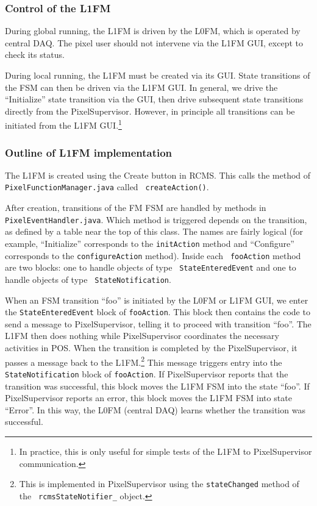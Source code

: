 \subsubsection{Control of the L1FM}

During global running, the L1FM is driven by the L0FM, which is
operated by central DAQ. The pixel user should not intervene via the
L1FM GUI, except to check its status.

During local running, the L1FM must be created via its GUI. State
transitions of the FSM can then be driven via the L1FM GUI. In
general, we drive the ``Initialize'' state transition via the GUI,
then drive subsequent state transitions directly from the
PixelSupervisor. However, in principle all transitions can be
initiated from the L1FM GUI.\footnote{In practice, this is only useful for simple tests of the L1FM to PixelSupervisor communication.}

\subsubsection{Outline of L1FM implementation}

The L1FM is created using the Create button in RCMS. This calls the
method of {\tt PixelFunctionManager.java} called {\tt
createAction()}.

After creation, transitions of the FM FSM are handled
by methods in {\tt PixelEventHandler.java}. Which method is triggered
depends on the transition, as defined by a table near the top of this
class. The names are fairly logical (for example, ``Initialize''
corresponds to the {\tt initAction} method and ``Configure''
corresponds to the {\tt configureAction} method). Inside each {\tt
fooAction} method are two blocks: one to handle objects of type {\tt
StateEnteredEvent} and one to handle objects of type {\tt
StateNotification}. 

When an FSM transition ``foo'' is initiated by the L0FM or L1FM GUI,
we enter the {\tt StateEnteredEvent} block of {\tt fooAction}. This
block then contains the code to send a message to PixelSupervisor,
telling it to proceed with transition ``foo''. The L1FM then does
nothing while PixelSupervisor coordinates the necessary activities in
POS. When the transition is completed by the PixelSupervisor, it
passes a message back to the L1FM.\footnote{This is implemented in
PixelSupervisor using the {\tt stateChanged} method of the {\tt
rcmsStateNotifier\_} object.} This message triggers entry into the {\tt
StateNotification} block of {\tt fooAction}. If PixelSupervisor
reports that the transition was successful, this block moves the L1FM
FSM into the state ``foo''. If PixelSupervisor reports an error, this
block moves the L1FM FSM into state ``Error''. In this way, the L0FM
(central DAQ) learns whether the transition was successful.



